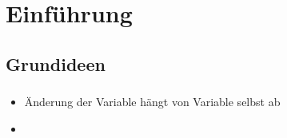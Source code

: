 \section{Einführung}
\label{sec:Introduction}


\subsection{Grundideen}
\label{subsec:basic-concepts}
\begin{frame}
	\frametitle{\insertsubsection}
	\begin{itemize}
		\item Änderung der Variable hängt von Variable selbst ab
		\item 
	\end{itemize}
\end{frame}



